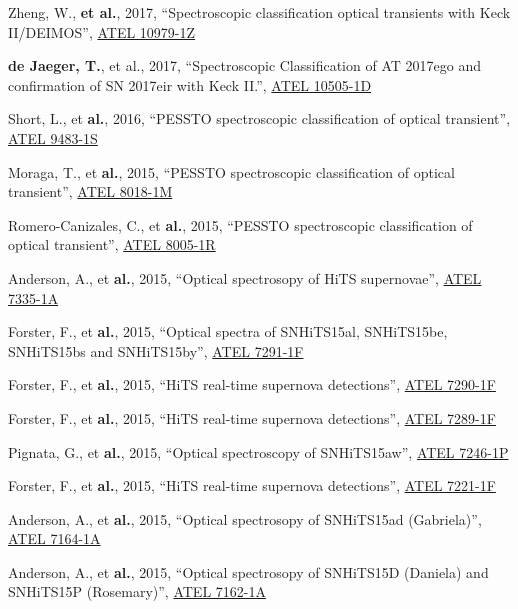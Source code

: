 \documentclass[12pt]{article}
\begin{document}
\begin{bibenum}
    \item Zheng, W., \textbf{et al.}, 2017, ``Spectroscopic classification optical transients with Keck II/DEIMOS'', \href{http://adsabs.harvard.edu/abs/2017ATel10979....1Z}{ATEL 10979-1Z}
    \item \textbf{de Jaeger, T.}, et al., 2017, ``Spectroscopic Classification of AT 2017ego and confirmation of SN 2017eir with Keck II.'', \href{http://adsabs.harvard.edu/abs/2017ATel.10505....1D}{ATEL 10505-1D}
    \item Short, L., et \textbf{al.}, 2016, ``PESSTO spectroscopic classification of optical transient'', \href{http://adsabs.harvard.edu/abs/2016ATel.9483....1S}{ATEL 9483-1S}
    \item Moraga, T., et \textbf{al.}, 2015, ``PESSTO spectroscopic classification of optical transient'', \href{http://adsabs.harvard.edu/abs/2015ATel.8018....1M}{ATEL 8018-1M}
    \item Romero-Canizales, C., et \textbf{al.}, 2015, ``PESSTO spectroscopic classification of optical transient'', \href{http://adsabs.harvard.edu/abs/2015ATel.8005....1R}{ATEL 8005-1R}
    \item Anderson, A., et \textbf{al.}, 2015, ``Optical spectrosopy of HiTS supernovae'', \href{http://adsabs.harvard.edu/abs/2015ATel.7335....1A}{ATEL 7335-1A}
    \item Forster, F., et \textbf{al.}, 2015, ``Optical spectra of SNHiTS15al, SNHiTS15be, SNHiTS15bs and SNHiTS15by'', \href{http://adsabs.harvard.edu/abs/2015ATel.7291....1F}{ATEL 7291-1F}
    \item Forster, F., et \textbf{al.}, 2015, ``HiTS real-time supernova detections'', \href{http://adsabs.harvard.edu/abs/2015ATel.7290....1F}{ATEL 7290-1F}
    \item Forster, F., et \textbf{al.}, 2015, ``HiTS real-time supernova detections'', \href{http://adsabs.harvard.edu/abs/2015ATel.7289....1F}{ATEL 7289-1F}
    \item Pignata, G., et \textbf{al.}, 2015, ``Optical spectroscopy of SNHiTS15aw'', \href{http://adsabs.harvard.edu/abs/2015ATel.7246....1P}{ATEL 7246-1P}
    \item Forster, F., et \textbf{al.}, 2015, ``HiTS real-time supernova detections'', \href{http://adsabs.harvard.edu/abs/2015ATel.7221....1F}{ATEL 7221-1F}
    \item Anderson, A., et \textbf{al.}, 2015, ``Optical spectrosopy of SNHiTS15ad (Gabriela)'', \href{http://adsabs.harvard.edu/abs/2015ATel.7164....1A}{ATEL 7164-1A}
    \item Anderson, A., et \textbf{al.}, 2015, ``Optical spectrosopy of SNHiTS15D (Daniela) and SNHiTS15P (Rosemary)'', \href{http://adsabs.harvard.edu/abs/2015ATel.7162....1A}{ATEL 7162-1A}

\end{bibenum}
\end{document}
